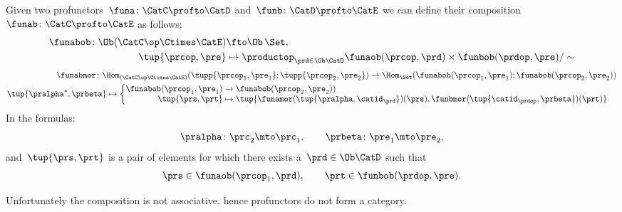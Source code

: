 \begin{widepar}
\begin{ctdefinition}
  \label{def:profunctor-composition}
  Given two profunctors~$\funa\colon \CatC \profto \CatD$ and~$\funb\colon \CatD \profto \CatE$
  we can define their composition~$\funab\colon \CatC \profto \CatE$ as follows:
  \begin{equation}
    \begin{aligned}
    \funabob \colon \Ob(\CatC\op \Ctimes \CatE) & \fto  \Ob\, \Set, \\
    \tup{\prcop, \pre} & \mapsto \productop_{\prd\in\Ob \CatD} \funaob(\prcop, \prd) \times \funbob(\prdop, \pre) / \sim
    \end{aligned}
  \end{equation}
  \begin{equation}
    \begin{aligned}
      \funabmor  \colon \Hom_{(\CatC\op \Ctimes \CatE)}( \tupp{\prcop_1, \pre_1}; \tupp{\prcop_2, \pre_2}) \to \Hom_{\Set}( \funabob(\prcop_1, \pre_1); \funabob(\prcop_2, \pre_2)) \\
      \tup{\pralpha^\ast, \prbeta} \mapsto  \begin{cases}
        \begin{aligned}
          \funabob(\prcop_1, \pre_1) & \to   \funabob(\prcop_2, \pre_2)) \\
          \tup{\prs, \prt} & \mapsto  \tup{
              \funamor(\tup{\pralpha, \catid_{\prd}})(\prs),
              \funbmor(\tup{\catid_{\prdop}, \prbeta})(\prt)}
        \end{aligned}
      \end{cases}
    \end{aligned}
  \end{equation}
  In the formulas:
\begin{equation}
  \pralpha\colon \prc_2 \mto \prc_1, \qquad
  \prbeta\colon \pre_1 \mto \pre_2,
\end{equation}
and~$\tup{\prs, \prt}$ is a pair of elements for which there exists a~$\prd\in\Ob \CatD$ such that
  \begin{equation}
    \prs \in \funaob(\prcop_1, \prd), \qquad\prt \in \funbob(\prdop, \pre).
\end{equation}
\end{ctdefinition}
\end{widepar}

Unfortunately the composition is not associative, hence profunctors do not form a category.

